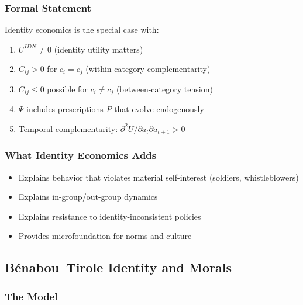 \subsubsection{Formal Statement}

\begin{proposition}
Identity economics is the special case with:
\begin{enumerate}
  \item $U^{IDN} \neq 0$ (identity utility matters)
  \item $C_{ij} > 0$ for $c_i = c_j$ (within-category complementarity)
  \item $C_{ij} \leq 0$ possible for $c_i \neq c_j$ (between-category tension)
  \item $\Psi$ includes prescriptions $P$ that evolve endogenously
  \item Temporal complementarity: $\partial^2 U / \partial a_t \partial a_{t+1} > 0$
\end{enumerate}
\end{proposition}

\subsubsection{What Identity Economics Adds}

\begin{itemize}
  \item Explains behavior that violates material self-interest (soldiers, whistleblowers)
  \item Explains in-group/out-group dynamics
  \item Explains resistance to identity-inconsistent policies
  \item Provides microfoundation for norms and culture
\end{itemize}

\subsection{Bénabou--Tirole Identity and Morals}
\label{app:benaboutirole}

\subsubsection{The Model}

